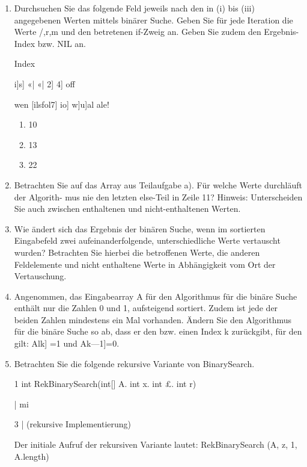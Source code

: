 \documentclass{bschlangaul-aufgabe}
\begin{document}
\begin{enumerate}


\item Durchsuchen Sie das folgende Feld jeweils nach den in (i) bis
(iii) angegebenen Werten mittels binärer Suche. Geben Sie für jede
Iteration die Werte /,r,m und den betretenen if-Zweig an. Geben Sie
zudem den Ergebnis-Index bzw. NIL an.

Index

i]s] «| «| 2] 4] off

wen [ilsfol7] io] w]u]al ale!
\begin{enumerate}

\item 10

\item 13

\item 22
\end{enumerate}


\item Betrachten Sie auf das Array aus Teilaufgabe a). Für welche Werte
durchläuft der Algorith- mus nie den letzten else-Teil in Zeile 11?
Hinweis: Unterscheiden Sie auch zwischen enthaltenen und
nicht-enthaltenen Werten.


\item Wie ändert sich das Ergebnis der binären Suche, wenn im sortierten
Eingabefeld zwei aufeinanderfolgende, unterschiedliche Werte
vertauscht wurden? Betrachten Sie hierbei die betroffenen Werte, die
anderen Feldelemente und nicht enthaltene Werte in Abhängigkeit vom Ort
der Vertauschung.


\item Angenommen, das Eingabearray A für den Algorithmus für die binäre
Suche enthält nur die Zahlen 0 und 1, aufsteigend sortiert. Zudem ist
jede der beiden Zahlen mindestens ein Mal vorhanden. Ändern Sie den
Algorithmus für die binäre Suche so ab, dass er den bzw. einen Index k
zurückgibt, für den gilt: Alk] =1 und Ak—1]=0.


\item Betrachten Sie die folgende rekursive Variante von BinarySearch.

1 int RekBinarySearch(int[] A. int x. int £. int r)

| mi

3 | (rekursive Implementierung)

Der initiale Aufruf der rekursiven Variante lautet:
RekBinarySearch (A, z, 1, A.length)
\end{enumerate}
\end{document}
